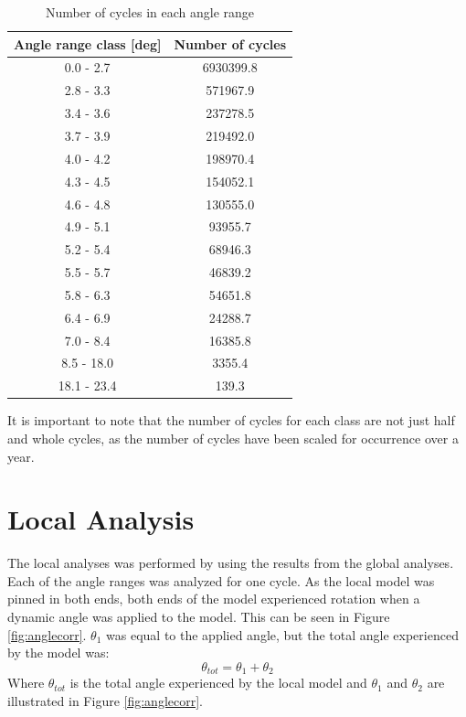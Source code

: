 \begin{table} [H]
\centering
\begin{tabular}{ |c|c|}
\hline
Angle range class [deg] & Number of cycles \\
 \hline
 \hline
0.0 - 2.7 & 6930399.8\\

2.8 - 3.3 & 571967.9\\
 
3.4 - 3.6 & 237278.5 \\
 
3.7 - 3.9& 219492.0  \\

4.0 - 4.2& 198970.4  \\

4.3  - 4.5 & 154052.1  \\

4.6 - 4.8 & 130555.0 \\

4.9 - 5.1 & 93955.7 \\

5.2 - 5.4 & 68946.3 \\

5.5 - 5.7 & 46839.2 \\

5.8 - 6.3 & 54651.8 \\

6.4 - 6.9 & 24288.7 \\

7.0 - 8.4 & 16385.8 \\

8.5 - 18.0 & 3355.4 \\

18.1 - 23.4 & 139.3  \\

 \hline
\end{tabular}
\caption{Number of cycles in each angle range}
\label{table:angleclass}
\end{table} 
\noindent It is important to note that the number of cycles for each class are not just half and whole cycles, as the number of cycles have been scaled for occurrence over a year.\newline 
\newline

\section{Local Analysis}
The local analyses was performed by using the results from the global analyses. Each of the angle ranges was analyzed for one cycle. As the local model was pinned in both ends, both ends of the model experienced rotation when a dynamic angle was applied to the model. This can be seen in Figure \ref{fig:anglecorr}. $\theta_1$ was equal to the applied angle, but the total angle experienced by the model was:
\begin{equation}
    \theta_{tot}=\theta_1 + \theta_2
\end{equation}
Where $\theta_{tot}$ is the total angle experienced by the local model and $\theta_1$ and $\theta_2$ are illustrated in Figure \ref{fig:anglecorr}.

